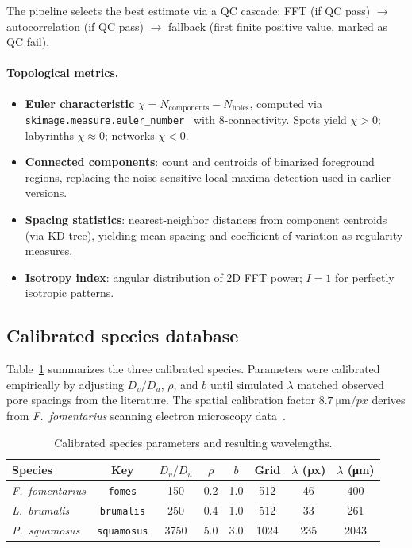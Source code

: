 \documentclass[review,3p]{elsarticle}
\begin{document}
The pipeline selects the best estimate via a QC cascade:
FFT (if QC pass) $\to$ autocorrelation (if QC pass) $\to$ fallback
(first finite positive value, marked as QC fail).

\paragraph{Topological metrics.}
\begin{itemize}
  \item \textbf{Euler characteristic}
    $\chi = N_\text{components} - N_\text{holes}$, computed via
    \texttt{skimage.measure.euler\_number}~\cite{euler_number_skimage}
    with 8-connectivity. Spots yield $\chi > 0$; labyrinths
    $\chi \approx 0$; networks $\chi < 0$.
  \item \textbf{Connected components}: count and centroids of
    binarized foreground regions, replacing the noise-sensitive local
    maxima detection used in earlier versions.
  \item \textbf{Spacing statistics}: nearest-neighbor distances from
    component centroids (via KD-tree), yielding mean spacing and
    coefficient of variation as regularity measures.
  \item \textbf{Isotropy index}: angular distribution of 2D FFT power;
    $I = 1$ for perfectly isotropic patterns.
\end{itemize}

\subsection{Calibrated species database}
\label{sec:species}

Table~\ref{tab:species} summarizes the three calibrated species.
Parameters were calibrated empirically by adjusting $D_v/D_u$,
$\rho$, and $b$ until simulated $\lambda$ matched observed pore
spacings from the literature. The spatial calibration factor
$\SI{8.7}{\micro\metre/px}$ derives from \textit{F.~fomentarius}
scanning electron microscopy data~\cite{klemm2024}.

\begin{table}[ht]
\centering
\caption{Calibrated species parameters and resulting wavelengths.}
\label{tab:species}
\begin{tabular}{@{}lccccccc@{}}
\toprule
Species & Key & $D_v/D_u$ & $\rho$ & $b$ & Grid
  & $\lambda$ (px) & $\lambda$ (\si{\micro\metre}) \\
\midrule
\textit{F.~fomentarius} & \texttt{fomes}
  & 150 & 0.2 & 1.0 & 512 & 46 & 400 \\
\textit{L.~brumalis}    & \texttt{brumalis}
  & 250 & 0.4 & 1.0 & 512 & 33 & 261 \\
\textit{P.~squamosus}   & \texttt{squamosus}
  & 3750 & 5.0 & 3.0 & 1024 & 235 & 2043 \\
\bottomrule
\end{tabular}
\end{table}
\end{document}
